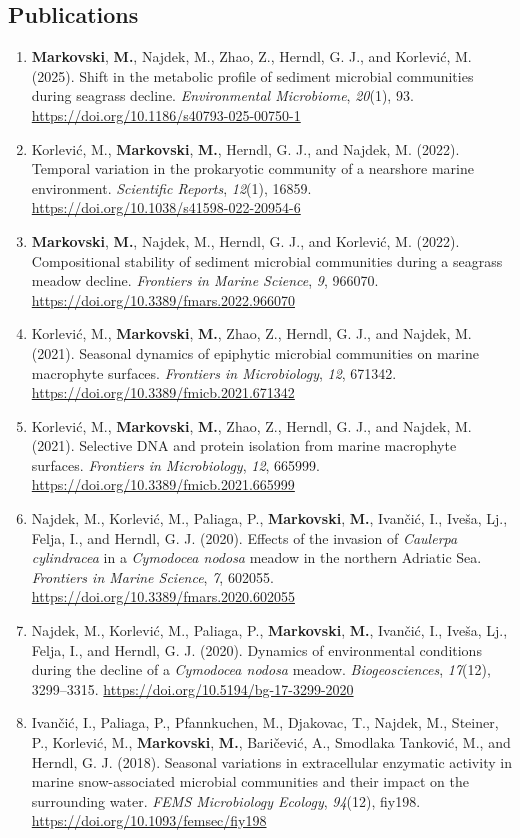 \documentclass[
  12 pt,
]{book}
\begin{document}
\hypertarget{publications}{%
\subsection*{Publications}\label{publications}}

\begin{enumerate}
\def\labelenumi{\arabic{enumi}.}
\item
  \textbf{Markovski}, \textbf{M.}, Najdek, M., Zhao, Z., Herndl, G. J., and Korlević, M. (2025). Shift in the metabolic profile of sediment microbial communities during seagrass decline. \emph{Environmental Microbiome}, \emph{20}(1), 93. \url{https://doi.org/10.1186/s40793-025-00750-1}
\item
  Korlević, M., \textbf{Markovski}, \textbf{M.}, Herndl, G. J., and Najdek, M. (2022). Temporal variation in the prokaryotic community of a nearshore marine environment. \emph{Scientific Reports}, \emph{12}(1), 16859. \url{https://doi.org/10.1038/s41598-022-20954-6}
\item
  \textbf{Markovski}, \textbf{M.}, Najdek, M., Herndl, G. J., and Korlević, M. (2022). Compositional stability of sediment microbial communities during a seagrass meadow decline. \emph{Frontiers in Marine Science}, \emph{9}, 966070. \url{https://doi.org/10.3389/fmars.2022.966070}
\item
  Korlević, M., \textbf{Markovski}, \textbf{M.}, Zhao, Z., Herndl, G. J., and Najdek, M. (2021). Seasonal dynamics of epiphytic microbial communities on marine macrophyte surfaces. \emph{Frontiers in Microbiology}, \emph{12}, 671342. \url{https://doi.org/10.3389/fmicb.2021.671342}
\item
  Korlević, M., \textbf{Markovski}, \textbf{M.}, Zhao, Z., Herndl, G. J., and Najdek, M. (2021). Selective DNA and protein isolation from marine macrophyte surfaces. \emph{Frontiers in Microbiology}, \emph{12}, 665999. \url{https://doi.org/10.3389/fmicb.2021.665999}
\item
  Najdek, M., Korlević, M., Paliaga, P., \textbf{Markovski}, \textbf{M.}, Ivančić, I., Iveša, Lj., Felja, I., and Herndl, G. J. (2020). Effects of the invasion of \emph{Caulerpa cylindracea} in a \emph{Cymodocea nodosa} meadow in the northern Adriatic Sea. \emph{Frontiers in Marine Science}, \emph{7}, 602055. \url{https://doi.org/10.3389/fmars.2020.602055}
\item
  Najdek, M., Korlević, M., Paliaga, P., \textbf{Markovski}, \textbf{M.}, Ivančić, I., Iveša, Lj., Felja, I., and Herndl, G. J. (2020). Dynamics of environmental conditions during the decline of a \emph{Cymodocea nodosa} meadow. \emph{Biogeosciences}, \emph{17}(12), 3299--3315. \url{https://doi.org/10.5194/bg-17-3299-2020}
  \smallskip
\item
  Ivančić, I., Paliaga, P., Pfannkuchen, M., Djakovac, T., Najdek, M., Steiner, P., Korlević, M., \textbf{Markovski}, \textbf{M.}, Baričević, A., Smodlaka Tanković, M., and Herndl, G. J. (2018). Seasonal variations in extracellular enzymatic activity in marine snow-associated microbial communities and their impact on the surrounding water. \emph{FEMS Microbiology Ecology}, \emph{94}(12), fiy198. \url{https://doi.org/10.1093/femsec/fiy198}
\end{enumerate}
\end{document}
